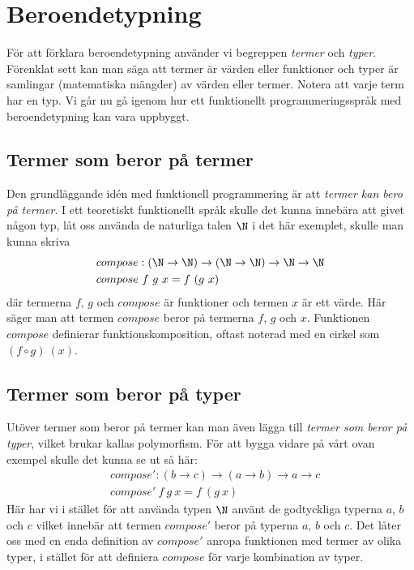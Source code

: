 \section{Beroendetypning}
För att förklara beroendetypning använder vi begreppen \emph{termer} och
\emph{typer}. Förenklat sett kan man säga att termer är värden eller funktioner
och typer är samlingar (matematiska mängder) av värden eller termer. Notera att
varje term har en typ. Vi går nu gå igenom hur ett funktionellt
programmeringsspråk med beroendetypning kan vara uppbyggt.

\subsection{Termer som beror på termer}
Den grundläggande idén med funktionell programmering är att \emph{termer kan
bero på termer}. I ett teoretiskt funktionellt språk skulle det kunna innebära
att givet någon typ, låt oss använda de naturliga talen $\N$ i det här
exemplet, skulle man kunna skriva
\begin{align*}
  &compose : (\N \to \N) \to (\N \to \N) \to \N \to \N \\
  &compose\ f\ g\ x = f\ (g\ x)
\end{align*}
där termerna $f$, $g$ och $compose$ är funktioner och termen $x$ är ett värde.
Här säger man att termen $compose$ beror på termerna $f$, $g$ och $x$.
Funktionen $compose$ definierar funktionskomposition, oftast noterad med en
cirkel som $(f \circ g)\ (x)$.


\subsection{Termer som beror på typer}
Utöver termer som beror på termer kan man även lägga till \emph{termer som
beror på typer}, vilket brukar kallas polymorfism. För att bygga vidare på vårt
ovan exempel skulle det kunna se ut så här:
\begin{align*}
  &compose' : (b \to c) \to (a \to b) \to a \to c \\
  &compose'\ f\ g\ x = f\ (g\ x)
\end{align*}
Här har vi i stället för att använda typen $\N$ använt de godtyckliga typerna
$a$, $b$ och $c$ vilket innebär att termen $compose'$ beror på typerna $a$, $b$
och $c$. Det låter oss med en enda definition av $compose'$ anropa funktionen
med termer av olika typer, i stället för att definiera $compose$ för varje
kombination av typer.

